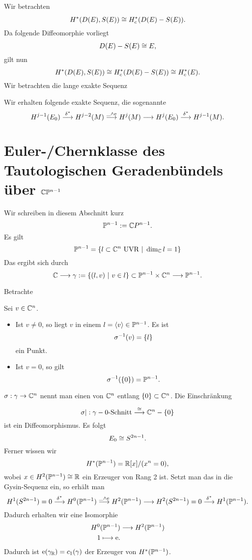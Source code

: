 Wir betrachten
\[ H^*(D(E), S(E))  \isom{} H^*_c(D(E) - S(E)). \]
Da folgende Diffeomorphie vorliegt
\[ D(E) - S(E) \isom{} E, \]
gilt nun 
\[ H^*(D(E), S(E))  \isom{} H^*_c(D(E) - S(E)) \isom{} H^*_c(E). \]
Wir betrachten die lange exakte Sequenz
\begin{center}
\end{center}
Wir erhalten folgende exakte Sequenz, die sogenannte 
\[ H^{j-1}(E_0) \Pfeil{\delta^*} H^{j-2} (M) \Pfeil{\_ \wedge \eu} H^j(M) \Pfeil{} H^j(E_0) \Pfeil{\delta^*} H^{j-1}(M). \]

\section{Euler-/Chernklasse des Tautologischen Geradenbündels über $\C\P^{n-1}$}
Wir schreiben in diesem Abschnitt kurz
\[ \P^{n-1} := \C P^{n-1}.\]
Es gilt
\[ \P^{n-1} = \set{l \subset \C^n \text{ UVR}}{
\dim_\C l = 1
} \]
Das  ergibt sich durch
\[ \C \Pfeil{} \gamma := \set{
(l,v)
}{
v \in l
} \subset \P^{n-1} \times \C^n \Pfeil{} \P^{n-1}. \]

Betrachte
\begin{center}
\end{center}
Sei $v \in \C^n$.
\begin{itemize}
	\item Ist $v\neq 0$, so liegt $v$ in einem $l = \shrp{v}\in \P^{n-1}$. Es ist
	\[ \sigma\i(v) = \{l\} \]
	ein Punkt.
	\item Ist $v = 0$, so gilt
	\[ \sigma\i(\{0\})  = \P^{n-1}.\]
\end{itemize}
$\sigma : \gamma \pfeil{} \C^n$ nennt man einen  von $\C^n$ entlang $\{0\} \subset \C^n$. Die Einschränkung
\[ \sigma| : \gamma - \text{0-Schnitt} \Pfeil{\isom{}} \C^n - \{0\} \]
ist ein Diffeomorphismus. Es folgt
\[ E_0 \isom{} S^{2n-1}. \]
Ferner wissen wir
\[ H^*(\P^{n-1}) = \R[x] /(x^n = 0), \]
wobei $x \in H^2(\P^{n-1})\isom{} \R$ ein Erzeuger von Rang 2 ist. Setzt man das in die Gysin-Sequenz ein, so erhält man
\[ H^{1}(S^{2n-1}) = 0 \Pfeil{\delta^*} H^0(\P^{n-1}) \Pfeil{\_ \wedge \eu} H^2(\P^{n-1}) \Pfeil{} H^2(S^{2n-1}) = 0\Pfeil{\delta^*}H^1(\P^{n-1}). \]
Dadurch erhalten wir eine Isomorphie
\begin{align*}
H^0(\P^{n-1}) & \Pfeil{} H^2(\P^{n-1})\\
1 \longmapsto \eu.
\end{align*}
Dadurch ist $\eu(\gamma_\R) = c_1(\gamma)$ der Erzeuger von $H^*(\P^{n-1})$.